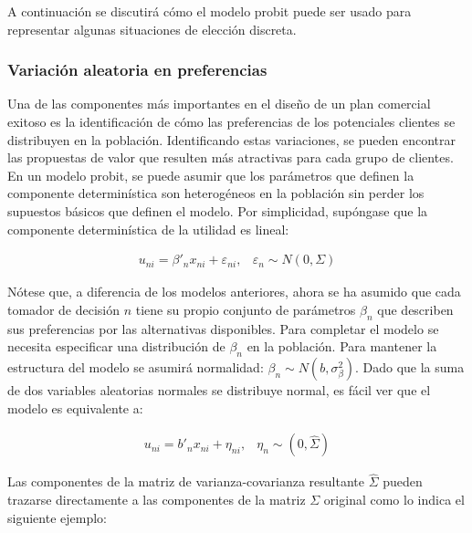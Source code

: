 \documentclass[
]{book}
\begin{document}
A continuación se discutirá cómo el modelo probit puede ser usado para representar algunas situaciones de elección discreta.

\hypertarget{variaciuxf3n-aleatoria-en-preferencias}{%
\subsubsection{Variación aleatoria en preferencias}\label{variaciuxf3n-aleatoria-en-preferencias}}

Una de las componentes más importantes en el diseño de un plan comercial exitoso es la identificación de cómo las preferencias de los potenciales clientes se distribuyen en la población. Identificando estas variaciones, se pueden encontrar las propuestas de valor que resulten más atractivas para cada grupo de clientes. En un modelo probit, se puede asumir que los parámetros que definen la componente determinística son heterogéneos en la población sin perder los supuestos básicos que definen el modelo. Por simplicidad, supóngase que la componente determinística de la utilidad es lineal:

\begin{equation} 
  \begin{array}{cc}
    u_{ni} = \beta'_{n} x_{ni} + \varepsilon_{ni}, & \varepsilon_n \sim N(0,\Sigma)
  \end{array}  
  \label{eq:cdeterminista}
\end{equation}

Nótese que, a diferencia de los modelos anteriores, ahora se ha asumido que cada tomador de decisión \(n\) tiene su propio conjunto de parámetros \(\beta_n\) que describen sus preferencias por las alternativas disponibles. Para completar el modelo se necesita especificar una distribución de \(\beta_n\) en la población. Para mantener la estructura del modelo se asumirá normalidad: \(\beta_n \sim N(b, \sigma^2_\beta)\). Dado que la suma de dos variables aleatorias normales se distribuye normal, es fácil ver que el modelo es equivalente a:

\begin{equation} 
  \begin{array}{cc}
    u_{ni} = b'_{n} x_{ni} + \eta_{ni}, & \eta_n \sim (0,\hat{\Sigma})
  \end{array}  
  \label{eq:cdeterministaequi}
\end{equation}

Las componentes de la matriz de varianza-covarianza resultante \(\hat{\Sigma}\) pueden trazarse directamente a las componentes de la matriz \(\Sigma\) original como lo indica el siguiente ejemplo:
\end{document}
